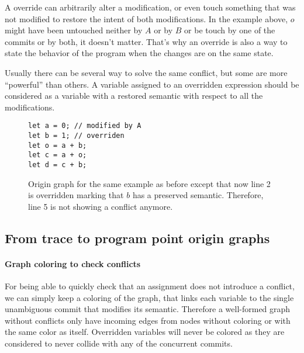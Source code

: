 \documentclass[a4paper,10pt]{article}
\begin{document}
A override can arbitrarily alter a modification, or even touch something that was not modified to restore the intent of both modifications. In the example above, $o$ might have been untouched neither by $A$ or by $B$ or be touch by one of the commits or by both, it doesn't matter. That's why an override is also a way to state the behavior of the program when the changes are on the same state.

Usually there can be several way to solve the same conflict, but some are more ``powerful'' than others. A variable assigned to an overridden expression should be considered as a variable with a restored semantic with respect to all the modifications.

\begin{figure}[ht]
\begin{minipage}{.5\textwidth}
\begin{lstlisting}
let a = 0; // modified by A
let b = 1; // overriden
let o = a + b;
let c = a + o;
let d = c + b;
\end{lstlisting}
\end{minipage}\hfill
\begin{minipage}{.45\textwidth}
\centering{}
\end{minipage}
\caption{Origin graph for the same example as before except that now line 2 is
overridden marking that $b$ has a preserved semantic. Therefore, line 5 is not showing a conflict anymore.}
\end{figure}

\subsection{From trace to program point origin graphs}
\paragraph{Graph coloring to check conflicts} For being able to quickly check that an assignment does not introduce a conflict, we can simply keep a coloring of the graph, that links each variable to the single unambiguous commit that modifies its semantic.
Therefore a well-formed graph without conflicts only have incoming edges from nodes without coloring or with the same color as itself.
Overridden variables will never be colored as they are considered to never collide with any of the concurrent commits.
\end{document}
